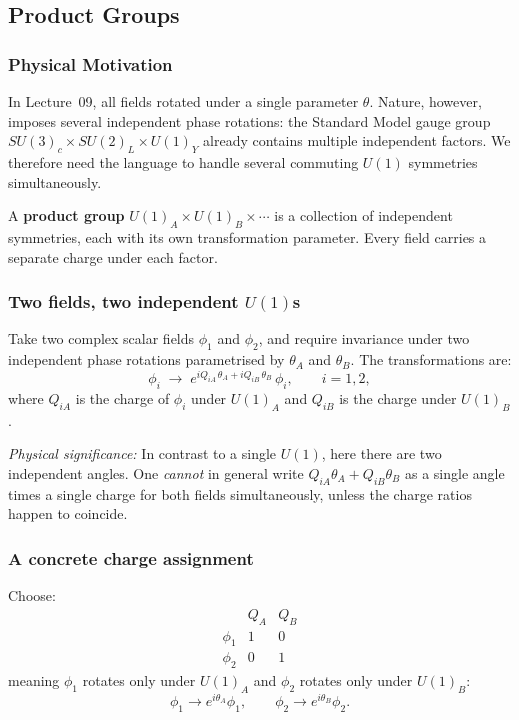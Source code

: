 \documentclass[../main.tex]{subfiles}
\begin{document}
\subsection*{Product Groups}

\subsubsection*{Physical Motivation}

In Lecture~09, all fields rotated under a single parameter $\theta$.  Nature, however, imposes several independent phase rotations: the Standard Model gauge group $SU(3)_c\times SU(2)_L\times U(1)_Y$ already contains multiple independent factors.  We therefore need the language to handle several commuting $U(1)$ symmetries simultaneously.

A \textbf{product group} $U(1)_A\times U(1)_B\times\cdots$ is a collection of independent symmetries, each with its own transformation parameter.  Every field carries a separate charge under each factor.

\subsubsection*{Two fields, two independent $U(1)$s}

Take two complex scalar fields $\phi_1$ and $\phi_2$, and require invariance under two independent phase rotations parametrised by $\theta_A$ and $\theta_B$.  The transformations are:
\begin{equation}
  \boxed{
  \phi_i \;\longrightarrow\;
  e^{i Q_{iA}\,\theta_A + i Q_{iB}\,\theta_B}\,\phi_i,
  \qquad i=1,2,}
  \label{eq:lec10:product-group-transformation}
\end{equation}
where $Q_{iA}$ is the charge of $\phi_i$ under $U(1)_A$ and $Q_{iB}$ is the charge under $U(1)_B$.

\textit{Physical significance:} In contrast to a single $U(1)$, here there are two independent angles.  One \emph{cannot} in general write $Q_{iA}\theta_A + Q_{iB}\theta_B$ as a single angle times a single charge for both fields simultaneously, unless the charge ratios happen to coincide.

\subsubsection*{A concrete charge assignment}

Choose:
\begin{equation}
  \boxed{
  \begin{array}{c|cc}
       & Q_{A} & Q_{B} \\ \hline
  \phi_1 & 1 & 0 \\
  \phi_2 & 0 & 1
  \end{array}}
  \label{eq:lec10:charge-assignment}
\end{equation}
meaning $\phi_1$ rotates only under $U(1)_A$ and $\phi_2$ rotates only under $U(1)_B$:
\begin{equation}
  \phi_1\to e^{i\theta_A}\phi_1, \qquad
  \phi_2\to e^{i\theta_B}\phi_2.
  \label{eq:lec10:example-transformations}
\end{equation}
\end{document}
